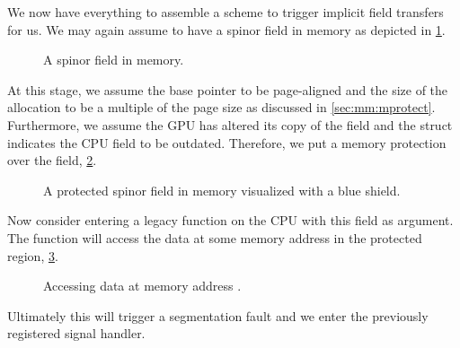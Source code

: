 We now have everything to assemble a scheme to trigger implicit field transfers for us.
We may again assume to have a spinor field in memory as depicted in \cref{fig:mm:field3:no_mprotect}.
\begin{figure}
  
  \caption{A spinor field in memory.}
  \label{fig:mm:field3:no_mprotect}
\end{figure}
At this stage, we assume the base pointer to be page-aligned and the size of the allocation to be a multiple of the page size as discussed in \cref{sec:mm:mprotect}.
Furthermore, we assume the GPU has altered its copy of the field and the  struct indicates the CPU field to be outdated.
Therefore, we put a memory protection over the field, \cref{fig:mm:field4:mprotected}.
\begin{figure}
  
  \caption{A protected spinor field in memory visualized with a blue shield.}
  \label{fig:mm:field4:mprotected}
\end{figure}
Now consider entering a legacy function on the CPU with this field as argument.
The function will access the data at some memory address in the protected region, \cref{fig:mm:field5:access}.
\begin{figure}
  
  \caption{Accessing data at memory address .}
  \label{fig:mm:field5:access}
\end{figure}
Ultimately this will trigger a segmentation fault and we enter the previously registered signal handler.

